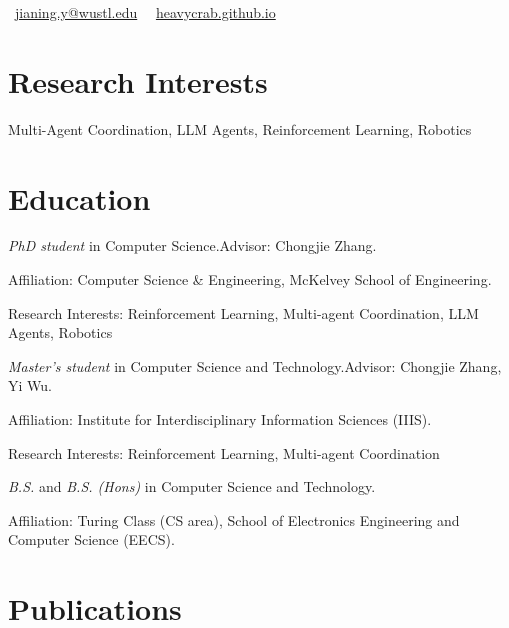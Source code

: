 \documentclass{resume}
\begin{document}


\centerline{\large{\faEnvelopeO\ \href{mailto:jianing.y@wustl.edu}{jianing.y@wustl.edu} \textperiodcentered\ \faGlobe\ \href{https://heavycrab.github.io}{heavycrab.github.io}}}
\vspace{1.5ex}

\section{Research Interests}
Multi-Agent Coordination, LLM Agents, Reinforcement Learning, Robotics

\section{Education}
\textit{PhD student} in Computer Science.\quad Advisor: Chongjie Zhang.

Affiliation: Computer Science \& Engineering, McKelvey School of Engineering.

Research Interests: Reinforcement Learning, Multi-agent Coordination, LLM Agents, Robotics

\textit{Master's student} in Computer Science and Technology.\quad Advisor: Chongjie Zhang, Yi Wu.

Affiliation: Institute for Interdisciplinary Information Sciences (IIIS).

Research Interests: Reinforcement Learning, Multi-agent Coordination

\textit{B.S.} and \textit{B.S. (Hons)} in Computer Science and Technology.

Affiliation: Turing Class (CS area), School of Electronics Engineering and Computer Science (EECS).





\section{Publications}
\end{document}
